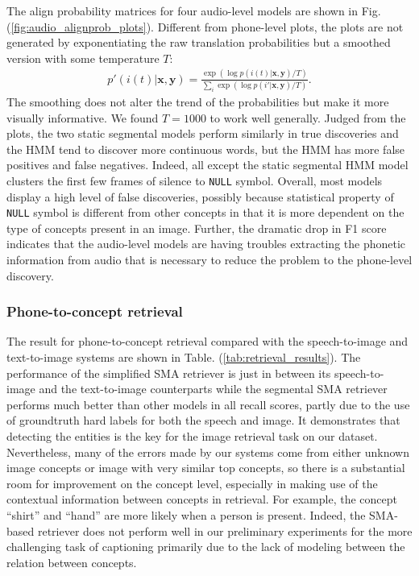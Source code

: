 \documentclass[journal]{IEEEtran}
\begin{document}
The align probability matrices for four audio-level models are shown in Fig. (\ref{fig:audio_alignprob_plots}). Different from phone-level plots, the plots are not generated by exponentiating the raw translation probabilities but a smoothed version with some temperature $T$:
\begin{align*}
    p'(i(t)|\mathbf x, \mathbf y) = \frac{\exp(\log p(i(t)|\mathbf x, \mathbf y)/T)}{\sum_i \exp(\log p(i'|\mathbf x, \mathbf y)/T)}.
\end{align*}
The smoothing does not alter the trend of the probabilities but make it more visually informative. We found $T=1000$ to work well generally. Judged from the plots, the two static segmental models perform similarly in true discoveries and the HMM tend to discover more continuous words, but the HMM has more false positives and false negatives. Indeed, all except the static segmental HMM model clusters the first few frames of silence to \texttt{NULL} symbol. Overall, most models display a high level of false discoveries, possibly because statistical property of \texttt{NULL} symbol is different from other concepts in that it is more dependent on the type of concepts present in an image. Further, the dramatic drop in F1 score indicates that the audio-level models are having troubles extracting the phonetic information from audio that is necessary to reduce the problem to the phone-level discovery. 

\subsubsection{Phone-to-concept retrieval}
The result for phone-to-concept retrieval compared with the speech-to-image and text-to-image systems are shown in Table. (\ref{tab:retrieval_results}). The performance of the simplified SMA retriever is just in between its speech-to-image and the text-to-image counterparts while the segmental SMA retriever performs much better than other models in all recall scores, partly due to the use of groundtruth hard labels for both the speech and image. It demonstrates that detecting the entities is the key for the image retrieval task on our dataset. Nevertheless, many of the errors made by our systems come from either unknown image concepts or image with very similar top concepts, so there is a substantial room for improvement on the concept level,  especially in making use of the contextual information between concepts in retrieval. For example, the concept ``shirt'' and ``hand'' are more likely when a person is present. Indeed, the SMA-based retriever does not perform well in our preliminary experiments for the more challenging task of captioning primarily due to the lack of modeling between the relation between concepts.  
\end{document}
